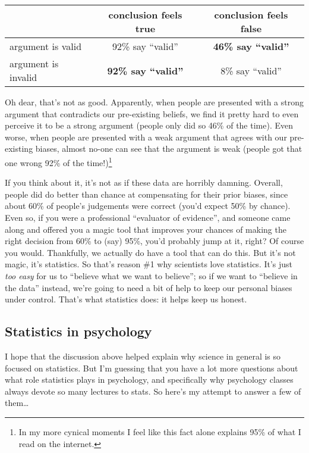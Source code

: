 \documentclass[]{book}
\let\rmarkdownfootnote\footnote%
\def\footnote{\protect\rmarkdownfootnote}
\begin{document}
\begin{longtable}[]{@{}lcc@{}}
\toprule
& conclusion feels true & conclusion feels false\tabularnewline
\midrule
\endhead
argument is valid & 92\% say ``valid'' & \textbf{46\% say ``valid''}\tabularnewline
argument is invalid & \textbf{92\% say ``valid''} & 8\% say ``valid''\tabularnewline
\bottomrule
\end{longtable}

Oh dear, that's not as good. Apparently, when people are presented with a strong argument that contradicts our pre-existing beliefs, we find it pretty hard to even perceive it to be a strong argument (people only did so 46\% of the time). Even worse, when people are presented with a weak argument that agrees with our pre-existing biases, almost no-one can see that the argument is weak (people got that one wrong 92\% of the time!)\footnote{In my more cynical moments I feel like this fact alone explains 95\% of what I read on the internet.}

If you think about it, it's not as if these data are horribly damning. Overall, people did do better than chance at compensating for their prior biases, since about 60\% of people's judgements were correct (you'd expect 50\% by chance). Even so, if you were a professional ``evaluator of evidence'', and someone came along and offered you a magic tool that improves your chances of making the right decision from 60\% to (say) 95\%, you'd probably jump at it, right? Of course you would. Thankfully, we actually do have a tool that can do this. But it's not magic, it's statistics. So that's reason \#1 why scientists love statistics. It's just \emph{too easy} for us to ``believe what we want to believe''; so if we want to ``believe in the data'' instead, we're going to need a bit of help to keep our personal biases under control. That's what statistics does: it helps keep us honest.

\hypertarget{statistics-in-psychology}{%
\subsection{Statistics in psychology}\label{statistics-in-psychology}}

I hope that the discussion above helped explain why science in general is so focused on statistics. But I'm guessing that you have a lot more questions about what role statistics plays in psychology, and specifically why psychology classes always devote so many lectures to stats. So here's my attempt to answer a few of them\ldots{}
\end{document}
